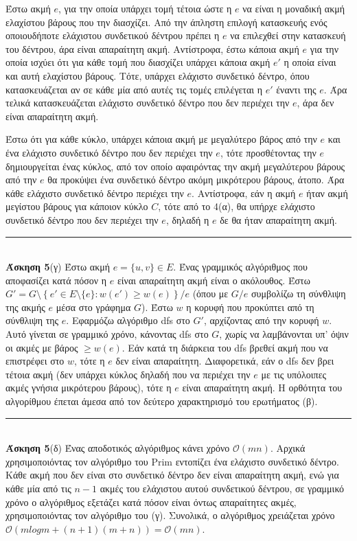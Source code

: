 \documentclass[12pt]{article}
\newcommand\en[1]{\latintext #1\greektext}
\newcommand\bigOh{\mathcal{O}}
\newenvironment{i_enum}{
\begin{enumerate}[label=(\roman{*})]
  \setlength{\itemsep}{0pt}
  \setlength{\parskip}{0pt}
  \setlength{\parsep}{0pt}
}{\end{enumerate}}
\newcommand{\HRule}{\rule{\linewidth}{0.1mm}}
\begin{document}
\begin{i_enum}
\item Έστω ακμή $e$, για την οποία υπάρχει τομή τέτοια ώστε η $e$ να είναι η μοναδική ακμή ελαχίστου βάρους που την διασχίζει. Από την άπληστη επιλογή κατασκευής ενός οποιουδήποτε ελάχιστου συνδετικού δέντρου πρέπει η $e$ να επιλεχθεί στην κατασκευή του δέντρου, άρα είναι απαραίτητη ακμή. Αντίστροφα, έστω κάποια ακμή $e$ για την οποία ισχύει ότι για κάθε τομή που διασχίζει υπάρχει κάποια ακμή $e'$ η οποία είναι και αυτή ελαχίστου βάρους. Τότε, υπάρχει ελάχιστο συνδετικό δέντρο, όπου κατασκευάζεται αν σε κάθε μία από αυτές τις τομές επιλέγεται η $e'$ έναντι της $e$. Άρα τελικά κατασκευάζεται ελάχιστο συνδετικό δέντρο που δεν περιέχει την $e$, άρα δεν είναι απαραίτητη ακμή.
\item Έστω ότι για κάθε κύκλο, υπάρχει κάποια ακμή με μεγαλύτερο βάρος από την $e$ και ένα ελάχιστο συνδετικό δέντρο που δεν περιέχει την $e$, τότε προσθέτοντας την $e$ δημιουργείται ένας κύκλος, από τον οποίο αφαιρόντας την ακμή μεγαλύτερου βάρους από την $e$ θα προκύψει ένα συνδετικό δέντρο ακόμη μικρότερου βάρους, άτοπο. Άρα κάθε ελάχιστο συνδετικό δέντρο περιέχει την $e$. Αντίστροφα, εάν η ακμή $e$ ήταν ακμή μεγίστου βάρους για κάποιον κύκλο $C$, τότε από το 4(α), θα υπήρχε ελάχιστο συνδετικό δέντρο που δεν περιέχει την $e$, δηλαδή η $e$ δε θα ήταν απαραίτητη ακμή.
\end{i_enum}
\HRule\\
{\bf Άσκηση 5}(γ) Έστω ακμή $e=\{u,v\}\in E$. Ένας γραμμικός αλγόριθμος που αποφασίζει κατά πόσον η $e$ είναι απαραίτητη ακμή είναι ο ακόλουθος. Έστω $G'=G\setminus\left\{e'\in E\setminus\{e\}:w(e')\geq w(e)\right\}/e$ (όπου με $G/e$ συμβολίζω τη σύνθλιψη της ακμής $e$ μέσα στο γράφημα $G$). Έστω $w$ η κορυφή που προκύπτει από τη σύνθλιψη της $e$. Εφαρμόζω αλγόριθμο \en{dfs} στο $G'$, αρχίζοντας από την κορυφή $w$. Αυτό γίνεται σε γραμμικό χρόνο, κάνοντας \en{dfs} στο $G$, χωρίς να λαμβάνονται υπ' όψιν οι ακμές με βάρος $\geq w(e)$. Εάν κατά τη διάρκεια του \en{dfs} βρεθεί ακμή που να επιστρέφει στο $w$, τότε η $e$ δεν είναι απαραίτητη. Διαφορετικά, εάν ο \en{dfs} δεν βρει τέτοια ακμή (δεν υπάρχει κύκλος δηλαδή που να περιέχει την $e$ με τις υπόλοιπες ακμές γνήσια μικρότερου βάρους), τότε η $e$ είναι απαραίτητη ακμή. Η ορθότητα του αλγορίθμου έπεται άμεσα από τον δεύτερο χαρακτηρισμό του ερωτήματος (β).\\
\HRule\\
{\bf Άσκηση 5}(δ) Ένας αποδοτικός αλγόριθμος κάνει χρόνο $\bigOh(mn)$. Αρχικά χρησιμοποιόντας τον αλγόριθμο του \en{Prim} εντοπίζει ένα ελάχιστο συνδετικό δέντρο. Κάθε ακμή που δεν είναι στο συνδετικό δέντρο δεν είναι απαραίτητη ακμή, ενώ για κάθε μία από τις $n-1$ ακμές του ελάχιστου αυτού συνδετικού δέντρου, σε γραμμικό χρόνο ο αλγόριθμος εξετάζει κατά πόσον είναι όντως απαραίτητες ακμές, χρησιμοποιόντας τον αλγόριθμο του (γ). Συνολικά, ο αλγόριθμος χρειάζεται χρόνο $\bigOh(mlogm+(n+1)(m+n))=\bigOh(mn)$.
\end{document}

